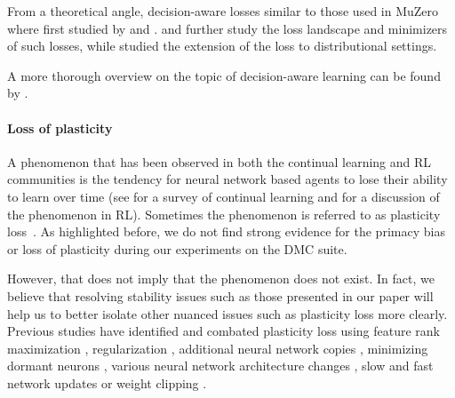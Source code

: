 From a theoretical angle, decision-aware losses similar to those used in MuZero where first studied by \textcite{vaml} and \textcite{itervaml}.
\textcite{grimm2020value} and \textcite{grimm2021proper} further study the loss landscape and minimizers of such losses, while \textcite{kastner2023distributional} studied the extension of the loss to distributional settings.

A more thorough overview on the topic of decision-aware learning can be found by \textcite{wei2024a}.


\paragraph{Loss of plasticity}
A phenomenon that has been observed in both the continual learning and RL communities is the tendency for neural network based agents to lose their ability to learn over time (see \textcite{parisi2019continual} for a survey of continual learning and \textcite{igl2021transient} for a discussion of the phenomenon in RL). Sometimes the phenomenon is referred to as plasticity loss~\parencite{lyle2022understanding, abbas2023loss,dohare2024loss}. 
As highlighted before, we do not find strong evidence for the primacy bias or loss of plasticity during our experiments on the DMC suite. 

However, that does not imply that the phenomenon does not exist. In fact, we believe that resolving stability issues such as those presented in our paper will help us to better isolate other nuanced issues such as plasticity loss more clearly.
Previous studies have identified and combated plasticity loss using feature rank maximization \parencite{kumar2021implicit}, regularization \parencite{lyle2023understanding}, additional neural network copies \parencite{nikishin2024deep}, minimizing dormant neurons \parencite{sokar2023dormant, xu2024drm}, various neural network architecture changes \parencite{lee2023plastic}, slow and fast network updates \parencite{lee2024slow} or weight clipping \parencite{elsayed2024weightclipping}. 

